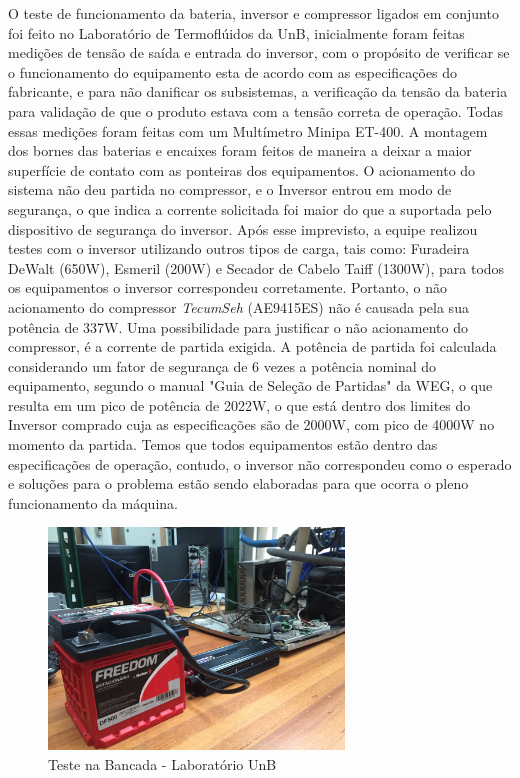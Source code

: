        O teste de funcionamento da bateria, inversor e compressor ligados em conjunto foi feito no Laboratório de Termoflúidos da UnB, inicialmente foram feitas medições de tensão de saída e entrada do inversor, com o propósito  de verificar se o funcionamento do equipamento esta de acordo com as especificações do fabricante, e para não danificar os subsistemas, a verificação da tensão da bateria para validação de que o produto estava com a tensão correta de operação. Todas essas medições foram feitas com um Multímetro Minipa ET-400. A montagem dos bornes das baterias e encaixes foram feitos de maneira a deixar a maior superfície de contato com as ponteiras dos equipamentos.
       O acionamento do sistema não deu partida no compressor, e o Inversor entrou em modo de segurança, o que indica  a corrente solicitada foi maior do que a suportada pelo dispositivo de segurança do inversor. Após esse imprevisto, a equipe realizou testes com o inversor utilizando outros tipos de carga, tais como: Furadeira DeWalt (650W), Esmeril (200W) e Secador de Cabelo Taiff (1300W), para todos os equipamentos o inversor correspondeu corretamente. Portanto,  o não acionamento do compressor \textit{TecumSeh} (AE9415ES) não é causada pela sua potência de 337W.
       Uma possibilidade para justificar o não acionamento do compressor, é a corrente de partida exigida. A potência de partida foi calculada considerando um fator de segurança de 6 vezes a potência nominal do equipamento, segundo o manual "Guia de Seleção de Partidas" da WEG, o que resulta em um pico de potência de 2022W, o que está dentro dos limites do Inversor comprado cuja as especificações são de 2000W, com pico de 4000W no momento da partida. Temos que todos equipamentos estão dentro das especificações de operação, contudo, o inversor não correspondeu como o esperado e soluções para o problema estão sendo elaboradas para que ocorra o pleno funcionamento da máquina.

  \begin{figure}[H]
    \centering
    \includegraphics[width=0.7\textwidth]{figuras/teste_bancada}
    \caption{Teste na Bancada - Laboratório UnB}
    \label{fig:teste_bancada}
\end{figure}

